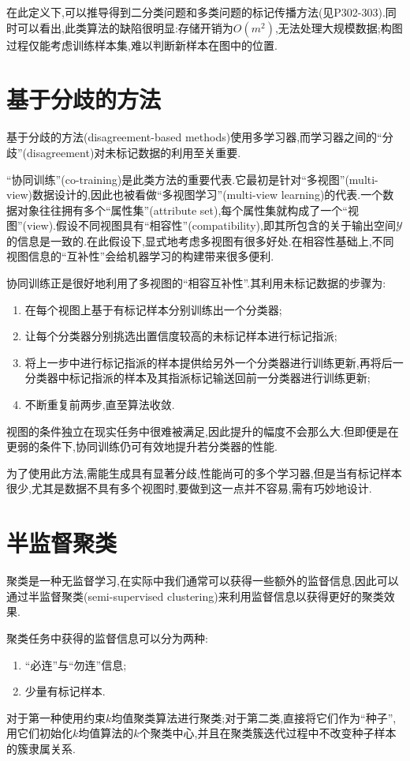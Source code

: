 在此定义下,可以推导得到二分类问题和多类问题的标记传播方法(见P302-303).同时可以看出,此类算法的缺陷很明显:存储开销为$O(m^2)$,无法处理大规模数据;构图过程仅能考虑训练样本集,难以判断新样本在图中的位置.

\section{基于分歧的方法}

基于分歧的方法(disagreement-based methods)使用多学习器,而学习器之间的``分歧''(disagreement)对未标记数据的利用至关重要.

``协同训练''(co-training)是此类方法的重要代表.它最初是针对``多视图''(multi-view)数据设计的,因此也被看做``多视图学习''(multi-view learning)的代表.一个数据对象往往拥有多个``属性集''(attribute set),每个属性集就构成了一个``视图''(view).假设不同视图具有``相容性''(compatibility),即其所包含的关于输出空间$\mathcal Y$的信息是一致的.在此假设下,显式地考虑多视图有很多好处.在相容性基础上,不同视图信息的``互补性''会给机器学习的构建带来很多便利.

协同训练正是很好地利用了多视图的``相容互补性''.其利用未标记数据的步骤为:
\begin{enumerate}
\item 在每个视图上基于有标记样本分别训练出一个分类器;
\item 让每个分类器分别挑选出置信度较高的未标记样本进行标记指派;
\item 将上一步中进行标记指派的样本提供给另外一个分类器进行训练更新,再将后一分类器中标记指派的样本及其指派标记输送回前一分类器进行训练更新;
\item 不断重复前两步,直至算法收敛.
\end{enumerate}

视图的条件独立在现实任务中很难被满足,因此提升的幅度不会那么大.但即便是在更弱的条件下,协同训练仍可有效地提升若分类器的性能.

为了使用此方法,需能生成具有显著分歧,性能尚可的多个学习器,但是当有标记样本很少,尤其是数据不具有多个视图时,要做到这一点并不容易,需有巧妙地设计.

\section{半监督聚类}

聚类是一种无监督学习,在实际中我们通常可以获得一些额外的监督信息,因此可以通过半监督聚类(semi-supervised clustering)来利用监督信息以获得更好的聚类效果.

聚类任务中获得的监督信息可以分为两种:
\begin{enumerate}
\item ``必连''与``勿连''信息;
\item 少量有标记样本.
\end{enumerate}

对于第一种使用约束$k$均值聚类算法进行聚类;对于第二类,直接将它们作为``种子'',用它们初始化$k$均值算法的$k$个聚类中心,并且在聚类簇迭代过程中不改变种子样本的簇隶属关系.
